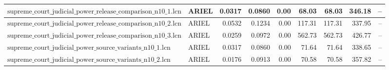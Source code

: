 \begin{table}[ht]
\begin{tabular}{llrrrrrrr}
$\text{supreme\_court\_judicial\_power\_release\_comparison\_n10\_1.lcn}$ & ARIEL & 0.0317 & 0.0860 & 0.00 & 68.03 & 68.03 & 346.18 & -- \\
\hline
$\text{supreme\_court\_judicial\_power\_release\_comparison\_n10\_2.lcn}$ & ARIEL & 0.0532 & 0.1234 & 0.00 & 117.31 & 117.31 & 337.95 & -- \\
\hline
$\text{supreme\_court\_judicial\_power\_release\_comparison\_n10\_3.lcn}$ & ARIEL & 0.0259 & 0.0972 & 0.00 & 562.73 & 562.73 & 426.77 & -- \\
\hline
$\text{supreme\_court\_judicial\_power\_source\_variants\_n10\_1.lcn}$ & ARIEL & 0.0317 & 0.0860 & 0.00 & 71.64 & 71.64 & 338.65 & -- \\
\hline
$\text{supreme\_court\_judicial\_power\_source\_variants\_n10\_2.lcn}$ & ARIEL & 0.0176 & 0.0913 & 0.00 & 70.58 & 70.58 & 357.82 & -- \\
\bottomrule
\end{tabular}
\end{table}

